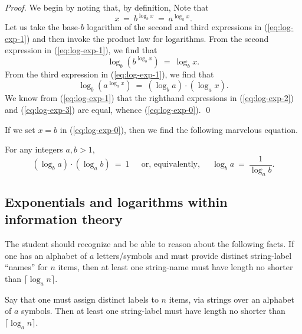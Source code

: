 \begin{proof}
We begin by noting that, by definition,
Note that
\begin{equation}
\label{eq:log-exp-1}
 x \ = \ b^{\log_b x} \ = \ a^{\log_a x} .
\end{equation}
Let us take the base-$b$ logarithm of the second and third expressions
in (\ref{eq:log-exp-1}) and then invoke the product law for logarithms.
From the second expression in (\ref{eq:log-exp-1}), we find that
\begin{equation}
\label{eq:log-exp-2}
 \log_b \left(b^{\log_b x} \right) \ = \ \log_b x .
\end{equation}
From the third expression in (\ref{eq:log-exp-1}), we find that
\begin{equation}
\label{eq:log-exp-3}
 \log_b \left( a^{\log_a x} \right) \ = \
\left(\log_b a \right) \cdot \left( \log_a x \right).
\end{equation}
We know from (\ref{eq:log-exp-1}) that the righthand expressions in
(\ref{eq:log-exp-2}) and (\ref{eq:log-exp-3}) are equal, whence
(\ref{eq:log-exp-0}).   \qed
\end{proof}

If we set $x = b$ in (\ref{eq:log-exp-0}), then we find the following
marvelous equation.

\begin{prop}
For any integers $a, b >1$,
\begin{equation}
\left(\log_b a \right) \cdot \left( \log_a b \right) \ = \ 1 \ \ \ \ \
\mbox{ or, equivalently, } \ \ \ \ \
\log_b a \ = \ \frac{1}{\log_a b} .
\end{equation}
\end{prop}


\subsection{Exponentials and logarithms within information theory}
\label{sec:count-strings}

The student should recognize and be able to reason about the following
facts.  If one has an alphabet of $a$ letters/symbols and must provide
distinct string-label ``names'' for $n$ items, then at least one
string-name must have length no shorter than $\lceil \log_a n \rceil$.

\begin{prop}
\label{thm:bound-stringnames-lgth-k}
Say that one must assign distinct labels to $n$ items, via strings
over an alphabet of $a$ symbols.  Then at least one string-label must
have length no shorter than $\lceil \log_a n \rceil$.
\end{prop}

